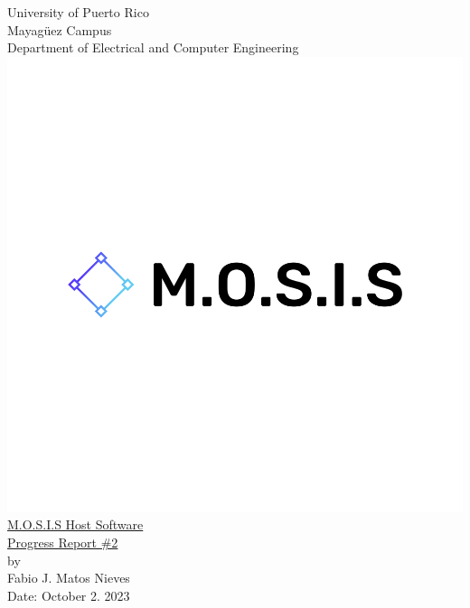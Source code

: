 \begin{titlepage}
  \begin{center}
    \large{University of Puerto Rico\\
    Mayagüez Campus\\
    \vspace{\baselineskip}
    Department of Electrical and Computer Engineering}
  \includegraphics[scale=0.2]{Title_Page/default.png}\\
    \Huge{\underline{M.O.S.I.S Host Software}\\}
    \Huge{\underline{Progress Report \#2}\\}
    \vspace{5cm}
    \large by\\
    Fabio J. Matos Nieves\\
    Date: October 2. 2023\\
    \normalsize
  \end{center}
\end{titlepage}
